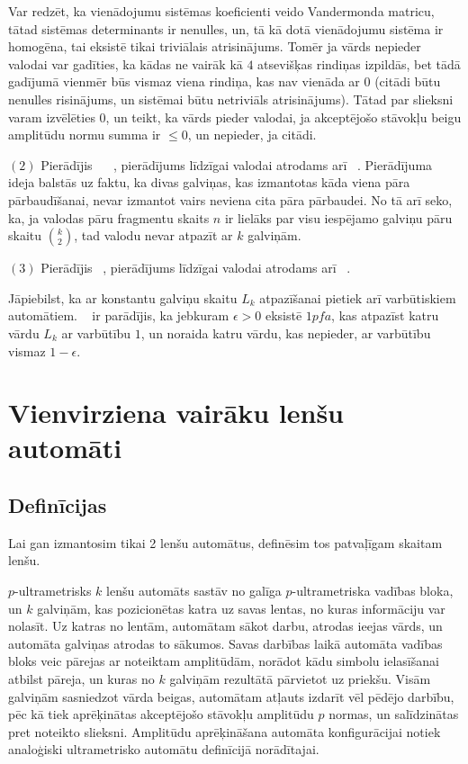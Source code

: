 \documentclass{ludis}
\begin{document}
\begin{pieradijums}
Var redzēt, ka vienādojumu sistēmas koeficienti veido Vandermonda matricu, tātad sistēmas determinants ir nenulles, un, tā kā dotā vienādojumu sistēma ir homogēna, tai eksistē tikai triviālais atrisinājums. Tomēr ja vārds nepieder valodai var gadīties, ka kādas ne vairāk kā $4$ atsevišķas rindiņas izpildās, bet tādā gadījumā vienmēr būs vismaz viena rindiņa, kas nav vienāda ar 0 (citādi būtu nenulles risinājums, un sistēmai būtu netriviāls atrisinājums). Tātad par slieksni varam izvēlēties 0, un teikt, ka vārds pieder valodai, ja akceptējošo stāvokļu beigu amplitūdu normu summa ir $\leq 0$, un nepieder, ja citādi.

$(2)$ Pierādījis ~\citet{Freivalds1982} ~\citep{Freivalds1979}, pierādījums līdzīgai valodai atrodams arī ~\citep{Yao1978}. Pierādījuma ideja balstās uz faktu, ka divas galviņas, kas izmantotas kāda viena pāra pārbaudīšanai, nevar izmantot vairs neviena cita pāra pārbaudei. No tā arī seko, ka, ja valodas pāru fragmentu skaits $n$ ir lielāks par visu iespējamo galviņu pāru skaitu ${k\choose 2}$, tad valodu nevar atpazīt ar $k$ galviņām.

$(3)$ Pierādījis ~\citet{Freivalds1982}, pierādījums līdzīgai valodai atrodams arī ~\citep{Yao1978}.
\end{pieradijums}

Jāpiebilst, ka ar konstantu galviņu skaitu $L_k$ atpazīšanai pietiek arī varbūtiskiem automātiem. ~\citet{Freivalds1982} ir parādījis, ka jebkuram $\epsilon > 0$ eksistē $1pfa$, kas atpazīst katru vārdu $L_k$ ar varbūtību $1$, un noraida katru vārdu, kas nepieder, ar varbūtību vismaz $1 - \epsilon$.

\chapter{Vienvirziena vairāku lenšu automāti}
\section{Definīcijas}
Lai gan izmantosim tikai 2 lenšu automātus, definēsim tos patvaļīgam skaitam lenšu.
\begin{definicija}
$p$-ultrametrisks $k$ lenšu automāts sastāv no galīga $p$-ultrametriska vadības bloka, un $k$ galviņām, kas pozicionētas katra uz savas lentas, no kuras informāciju var nolasīt. Uz katras no lentām, automātam sākot darbu, atrodas ieejas vārds, un automāta galviņas atrodas to sākumos. Savas darbības laikā automāta vadības bloks veic pārejas ar noteiktam amplitūdām, norādot kādu simbolu ielasīšanai atbilst pāreja, un kuras no $k$ galviņām rezultātā pārvietot uz priekšu. Visām galviņām sasniedzot vārda beigas, automātam atļauts izdarīt vēl pēdējo darbību, pēc kā tiek aprēķinātas akceptējošo stāvokļu amplitūdu $p$ normas, un salīdzinātas pret noteikto slieksni. Amplitūdu aprēķināšana automāta konfigurācijai notiek analoģiski ultrametrisko automātu definīcijā norādītajai.
\end{definicija}
\end{document}
